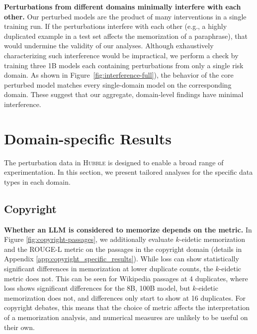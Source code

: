 \documentclass{article} %
\begin{document}
\textbf{Perturbations from different domains minimally interfere with each other.} Our perturbed models are the product of many interventions in a single training run. If the perturbations interfere with each other (e.g., a highly duplicated example in a test set affects the memorization of a paraphrase), that would undermine the validity of our analyses. Although exhaustively characterizing such interference \citep[as in][]{ilyas_datamodels_2022} would be impractical, we perform a check by training three 1B models each containing perturbations from only a single risk domain. As shown in Figure~\ref{fig:interference-full}), the behavior of the core perturbed model matches every single-domain model on the corresponding domain. These suggest that our aggregate, domain-level findings have minimal interference.

\section{Domain-specific Results} \label{sec:results_domain_specific}

The perturbation data in \textsc{Hubble} is designed to enable a broad range of experimentation. In this section, we present tailored analyses for the specific data types in each domain.

\subsection{Copyright}

\textbf{Whether an LLM is considered to memorize depends on the metric.} In Figure \ref{fig:copyright-passages}, we additionally evaluate $k$-eidetic memorization \cite[introduced in][]{DBLP:conf/iclr/CarliniIJLTZ23} and the ROUGE-L metric on the passages in the copyright domain (details in Appendix \ref{app:copyright_specific_results}).  While loss can show statistically significant differences in memorization at lower duplicate counts, the $k$-eidetic metric does not. This can be seen for Wikipedia passages at 4 duplicates, where loss shows significant differences for the 8B, 100B model, but $k$-eidetic memorization does not, and differences only start to show at 16 duplicates.  For copyright debates, this means that the choice of metric affects the interpretation of a memorization analysis, and numerical measures are unlikely to be useful on their own.
\end{document}
